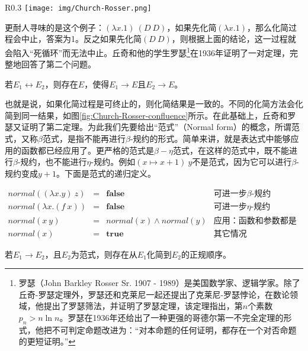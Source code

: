 \documentclass[b5paper]{ctexart}
\begin{document}
\begin{wrapfigure}{R}{0.3\textwidth}
 \centering
 \texttt{[image: img/Church-Rosser.png]}
 \captionsetup{labelformat=empty}
 \caption{丘奇-罗瑟定理的示意}
 \label{fig:Church-Rosser-confluence}
\end{wrapfigure}

更耐人寻味的是这个例子：$(\lambda x . 1)\ (D\ D)$，如果先化简$(\lambda x . 1)$，那么化简过程会中止，答案为1。反之如果先化简$(D\ D)$，则根据上面的结论，这一过程就会陷入“死循环”而无法中止。丘奇和他的学生罗瑟\footnote{罗瑟（John Barkley Rosser Sr. 1907 - 1989）是美国数学家、逻辑学家。除了丘奇-罗瑟定理外，罗瑟还和克莱尼一起还提出了克莱尼-罗瑟悖论，在数论领域，他提出了罗瑟筛法，并证明了罗瑟定理，该定理指出，第$n$个素数$p_n > n \ln n$。罗瑟在1936年还给出了一种更强的哥德尔第一不完全定理的形式，他把不可判定命题改进为：“对本命题的任何证明，都存在一个对否命题的更短证明。”}在1936年证明了一对定理，完整地回答了第二个问题。

\begin{theorem}[丘奇-罗瑟定理一]
若$E_1 \leftrightarrow E_2$，则存在$E$，使得$E_1 \to E$且$E_2 \to E$。
\end{theorem}

也就是说，如果化简过程是可终止的，则化简结果是一致的。不同的化简方法会化简到同一结果，如图\ref{fig:Church-Rosser-confluence}所示。在此基础上，丘奇和罗瑟又证明了第二定理。为此我们先要给出“范式”（Normal form）的概念，所谓范式，又称$\beta$范式，是指不能再进行$\beta$-规约的形式。简单来讲，就是表达式中能够应用的函数都已经应用了。更严格的范式是$\beta-\eta$范式，在这样的范式中，既不能进行$\beta$-规约，也不能进行$\eta$-规约。例如$(x \mapsto x + 1)\ y$不是范式，因为它可以进行$\beta$-规约变成$y + 1$。下面是范式的递归定义。

\[
\begin{array}{rcll}
normal((\lambda x . y)\ z) & = & \textbf{false} & \text{可进一步$\beta$-规约} \\
normal(\lambda x . (f\ x)) & = & \textbf{false} & \text{可进一步$\eta$-规约} \\
normal(x\ y) & = & normal(x) \land normal(y) & \text{应用：函数和参数都是范式} \\
normal(x) & = & \textbf{true} & \text{其它情况}
\end{array}
\]

\begin{theorem}[丘奇-罗瑟定理二]
若$E_1 \to E_2$，且$E_2$为范式，则存在从$E_1$化简到$E_2$的正规顺序。
\end{theorem}
\end{document}
